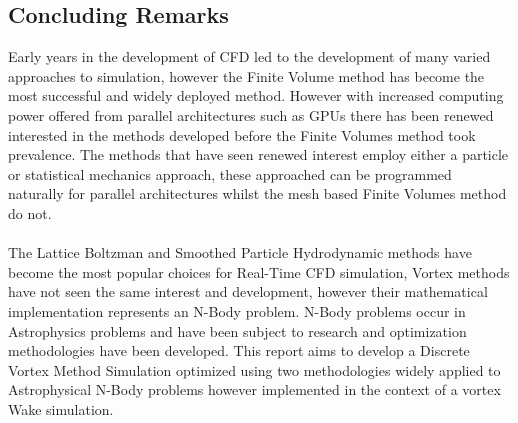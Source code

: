 \subsection{Concluding Remarks}
Early years in the development of CFD led to the development of many varied approaches to simulation, however the Finite Volume method has become the most successful and widely deployed method. However with increased computing power offered from parallel architectures such as GPUs there has been renewed interested in the methods developed before the Finite Volumes method took prevalence. The methods that have seen renewed interest employ either a particle or statistical mechanics approach, these approached can be programmed naturally for parallel architectures whilst the mesh based Finite Volumes method do not.
\\\\
The Lattice Boltzman and Smoothed Particle Hydrodynamic methods have become the most popular choices for Real-Time CFD simulation, Vortex methods have not seen the same interest and development, however their mathematical implementation represents an N-Body problem. N-Body problems occur in Astrophysics problems and have been subject to research and optimization methodologies have been developed. This report aims to develop a Discrete Vortex Method Simulation optimized using two methodologies widely applied to Astrophysical N-Body problems however implemented in the context of a vortex Wake simulation. 
\\\\
